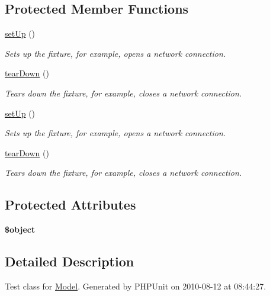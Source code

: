\subsection*{Protected Member Functions}
\begin{DoxyCompactItemize}
\item 
\hyperlink{class_model_test_acc5adf689b8f147e5c33414d46a35e07}{setUp} ()
\begin{DoxyCompactList}\small\item\em Sets up the fixture, for example, opens a network connection. \item\end{DoxyCompactList}\item 
\hyperlink{class_model_test_a7fe40c8bf1b04de42581af1eea432540}{tearDown} ()
\begin{DoxyCompactList}\small\item\em Tears down the fixture, for example, closes a network connection. \item\end{DoxyCompactList}\item 
\hyperlink{class_model_test_acc5adf689b8f147e5c33414d46a35e07}{setUp} ()
\begin{DoxyCompactList}\small\item\em Sets up the fixture, for example, opens a network connection. \item\end{DoxyCompactList}\item 
\hyperlink{class_model_test_a7fe40c8bf1b04de42581af1eea432540}{tearDown} ()
\begin{DoxyCompactList}\small\item\em Tears down the fixture, for example, closes a network connection. \item\end{DoxyCompactList}\end{DoxyCompactItemize}
\subsection*{Protected Attributes}
\begin{DoxyCompactItemize}
\item 
\hypertarget{class_model_test_a6ce54d4f205c64271578feb5cb0e696d}{
{\bfseries \$object}}
\label{class_model_test_a6ce54d4f205c64271578feb5cb0e696d}

\end{DoxyCompactItemize}


\subsection{Detailed Description}
Test class for \hyperlink{class_model}{Model}. Generated by PHPUnit on 2010-\/08-\/12 at 08:44:27.

